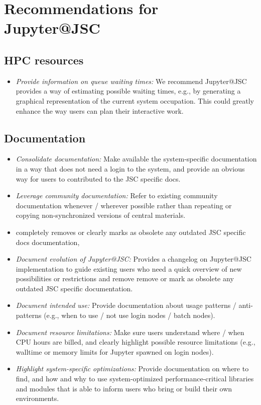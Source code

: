 \section{Recommendations for Jupyter@JSC}

\subsection{HPC resources}

\begin{itemize}
  \item \emph{Provide information on queue waiting times:} We recommend Jupyter@JSC provides a way of estimating possible waiting times, e.g., by generating a graphical representation of the current system occupation.
  This could greatly enhance the way users can plan their interactive work.
\end{itemize}


\subsection{Documentation}

\begin{itemize}
  \item \emph{Consolidate documentation:} Make available the system-specific documentation in a way that does not need a login to the system, and provide an obvious way for users to contributed to the JSC specific docs.
  \item \emph{Leverage community documentation:} Refer to existing community documentation whenever / wherever possible rather than repeating or copying non-synchronized versions of central materials.
  \item completely removes or clearly marks as obsolete any outdated JSC specific docs documentation,
  \item \emph{Document evolution of Jupyter@JSC:} Provides a changelog on Jupyter@JSC implementation to guide existing users who need a quick overview of new possibilities or restrictions and remove remove or mark as obsolete any outdated JSC specific documentation.
  \item \emph{Document intended use:} Provide documentation about usage patterns / anti-patterns (e.g., when to use / not use login nodes / batch nodes).
  \item \emph{Document resource limitations:} Make sure users understand where / when CPU hours are billed, and clearly highlight possible resource limitations (e.g., walltime or memory limits for Jupyter spawned on login nodes).
  \item \emph{Highlight system-specific optimizations:} Provide documentation on where to find, and how and why to use system-optimized performance-critical libraries and modules that is able to inform users who bring or build their own environments.
\end{itemize}



